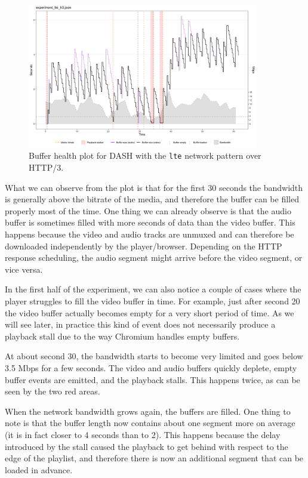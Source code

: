 \begin{figure}[h]
    \centering
    \includegraphics[width=0.9\textwidth]{res/eval_nonabr_lte_h3.png}
    \caption{Buffer health plot for DASH with the \texttt{lte} network pattern over HTTP/3.}
    \label{fig:eval_nonabr_lte_h3}
\end{figure}

What we can observe from the plot is that for the first 30 seconds the bandwidth is generally above the bitrate of the media, and therefore the buffer can be filled properly most of the time. One thing we can already observe is that the audio buffer is sometimes filled with more seconds of data than the video buffer. This happens because the video and audio tracks are unmuxed and can therefore be downloaded independently by the player/browser. Depending on the HTTP response scheduling, the audio segment might arrive before the video segment, or vice versa.

In the first half of the experiment, we can also notice a couple of cases where the player struggles to fill the video buffer in time. For example, just after second 20 the video buffer actually becomes empty for a very short period of time. As we will see later, in practice this kind of event does not necessarily produce a playback stall due to the way Chromium handles empty buffers.

At about second 30, the bandwidth starts to become very limited and goes below 3.5 Mbps for a few seconds. The video and audio buffers quickly deplete, empty buffer events are emitted, and the playback stalls. This happens twice, as can be seen by the two red areas.

When the network bandwidth grows again, the buffers are filled. One thing to note is that the buffer length now contains about one segment more on average (it is in fact closer to 4 seconds than to 2). This happens because the delay introduced by the stall caused the playback to get behind with respect to the edge of the playlist, and therefore there is now an additional segment that can be loaded in advance.

